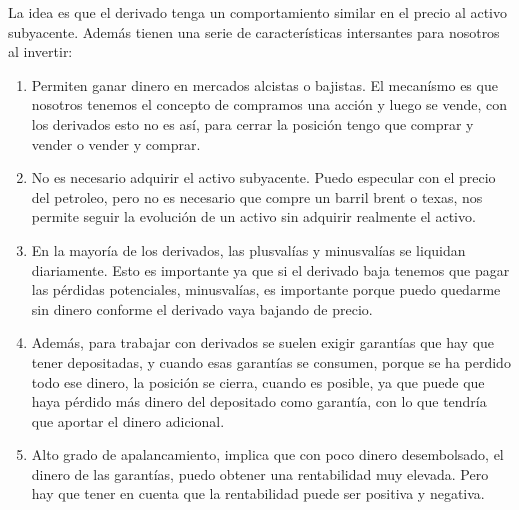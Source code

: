 La idea es que el derivado tenga un comportamiento similar en el precio al activo subyacente. Además tienen una serie de características intersantes para nosotros al invertir:
\begin{enumerate}
    \item Permiten ganar dinero en mercados alcistas o bajistas. El mecanísmo es que nosotros tenemos el concepto de compramos una acción y luego se vende, con los derivados esto no es así, para cerrar la posición tengo que comprar y vender o vender y comprar.
    \item No es necesario adquirir el activo subyacente. Puedo especular con el precio del petroleo, pero no es necesario que compre un barril brent o texas, nos permite seguir la evolución de un activo sin adquirir realmente el activo.
    \item En la mayoría de los derivados, las plusvalías y minusvalías se liquidan diariamente. Esto es importante ya que si el derivado baja tenemos que pagar las pérdidas potenciales, minusvalías, es importante porque puedo quedarme sin dinero conforme el derivado vaya bajando de precio. 
    \item Además, para trabajar con derivados se suelen exigir garantías que hay que tener depositadas, y cuando esas garantías se consumen, porque se ha perdido todo ese dinero, la posición se cierra, cuando es posible, ya que puede que haya pérdido más dinero del depositado como garantía, con lo que tendría que aportar el dinero adicional.
    \item Alto grado de apalancamiento, implica que con poco dinero desembolsado, el dinero de las garantías,  puedo obtener una rentabilidad muy elevada. Pero hay que tener en cuenta que la rentabilidad puede ser positiva y negativa.
\end{enumerate}